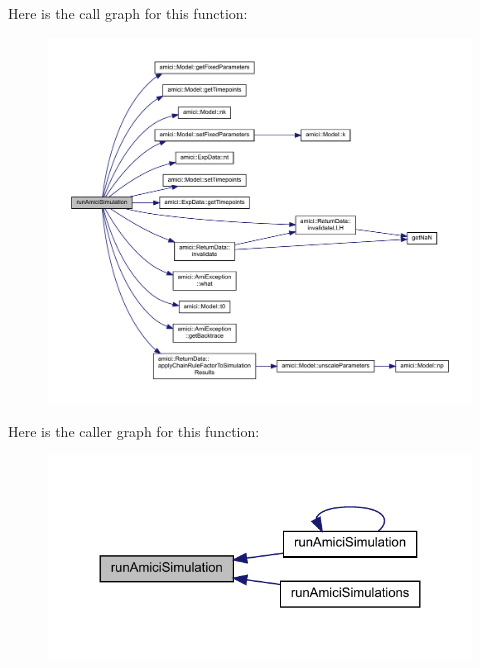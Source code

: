 Here is the call graph for this function\+:
\nopagebreak
\begin{figure}[H]
\begin{center}
\leavevmode
\includegraphics[width=350pt]{namespaceamici_a46331a204e7511587acc2cc0b1ce7ed0_cgraph}
\end{center}
\end{figure}
Here is the caller graph for this function\+:
\nopagebreak
\begin{figure}[H]
\begin{center}
\leavevmode
\includegraphics[width=324pt]{namespaceamici_a46331a204e7511587acc2cc0b1ce7ed0_icgraph}
\end{center}
\end{figure}
\mbox{\label{namespaceamici_aaadff5ccb22e546f3590e15f5ee30c1c}} 
